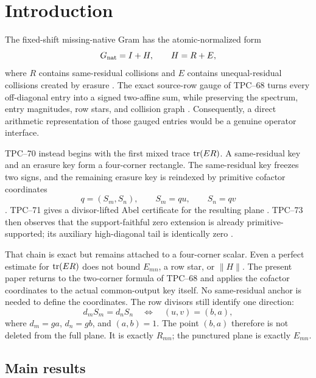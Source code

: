 \section{Introduction}
\label{sec:introduction}

The fixed-shift missing-native Gram has the atomic-normalized form
\[
 G_{\rm nat}=I+H,\qquad H=R+E,
\]
where \(R\) contains same-residual collisions and \(E\) contains
unequal-residual collisions created by erasure
\citep{WangTPC61,WangTPC68}.  The exact source-row gauge of TPC--68 turns
every off-diagonal entry into a signed two-affine sum, while preserving
the spectrum, entry magnitudes, row stars, and collision graph
\citep{WangTPC68}.  Consequently, a direct arithmetic representation of
those gauged entries would be a genuine operator interface.

TPC--70 instead begins with the first mixed trace \(\operatorname{tr}(ER)\).  A
same-residual key and an erasure key form a four-corner rectangle.  The
same-residual key freezes two signs, and the remaining erasure key is
reindexed by primitive cofactor coordinates
\[
 q=(S_m,S_n),\qquad S_m=qu,\qquad S_n=qv
\]
\citep{WangTPC70}.  TPC--71 gives a divisor-lifted Abel certificate for
the resulting plane \citep{WangTPC71}.  TPC--73 then observes that the
support-faithful zero extension is already primitive-supported; its
auxiliary high-diagonal tail is identically zero
\citep{WangTPC73}.

That chain is exact but remains attached to a four-corner scalar.  Even a
perfect estimate for \(\operatorname{tr}(ER)\) does not bound \(E_{mn}\), a row star, or
\(\|H\|\).  The present paper returns to the two-corner formula of
TPC--68 and applies the cofactor coordinates to the actual common-output
key itself.  No same-residual anchor is needed to define the coordinates.
The row divisors still identify one direction:
\[
 d_mS_m=d_nS_n
 \quad\Longleftrightarrow\quad
 (u,v)=(b,a),
\]
where \(d_m=ga\), \(d_n=gb\), and \((a,b)=1\).  The point \((b,a)\)
therefore is not deleted from the full plane.  It is exactly \(R_{mn}\);
the punctured plane is exactly \(E_{mn}\).

\subsection{Main results}

